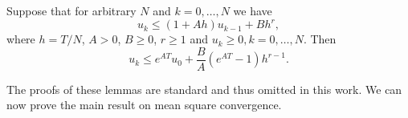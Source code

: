 \documentclass[10pt]{article}
\begin{document}
\begin{lemma}\label{lem:RecurrenceBound} Suppose that for arbitrary $N$ and $k = 0, \ldots, N$ we have
	\begin{equation}
		u_{k} \leq (1 + Ah) u_{k-1} + Bh^r,
	\end{equation}
	where $h = T / N$, $A > 0$, $B \geq 0$, $r \geq 1$ and $u_k \geq 0, k = 0, \ldots, N$. Then
	\begin{equation}
		u_k \leq e^{AT}u_0 + \frac{B}{A}(e^{AT} - 1) h^{r-1}.
	\end{equation}
\end{lemma}
The proofs of these lemmas are standard and thus omitted in this work. We can now prove the main result on mean square convergence.
\end{document}
